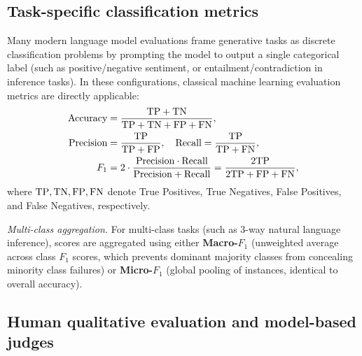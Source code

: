 \documentclass[../../../main.tex]{subfiles}
\begin{document}
\subsection{Task-specific classification metrics}
\label{subsec:classification_metrics}

Many modern language model evaluations frame generative tasks as discrete classification problems by prompting the model to output a single categorical label (such as positive/negative sentiment, or entailment/contradiction in inference tasks). In these configurations, classical machine learning evaluation metrics are directly applicable:
\begin{align}
\label{eq:accuracy_def}
\text{Accuracy} &= \frac{\mathrm{TP} + \mathrm{TN}}{\mathrm{TP} + \mathrm{TN} + \mathrm{FP} + \mathrm{FN}}, \\
\label{eq:precision_class_def}
\text{Precision} &= \frac{\mathrm{TP}}{\mathrm{TP} + \mathrm{FP}}, \quad \text{Recall} = \frac{\mathrm{TP}}{\mathrm{TP} + \mathrm{FN}}, \\
\label{eq:f1_class_def}
F_1 &= 2 \cdot \frac{\text{Precision} \cdot \text{Recall}}{\text{Precision} + \text{Recall}} = \frac{2 \mathrm{TP}}{2 \mathrm{TP} + \mathrm{FP} + \mathrm{FN}},
\end{align}
where $\mathrm{TP}, \mathrm{TN}, \mathrm{FP}, \mathrm{FN}$ denote True Positives, True Negatives, False Positives, and False Negatives, respectively.

\textit{Multi-class aggregation.} For multi-class tasks (such as 3-way natural language inference), scores are aggregated using either \textbf{Macro-$F_1$} (unweighted average across class $F_1$ scores, which prevents dominant majority classes from concealing minority class failures) or \textbf{Micro-$F_1$} (global pooling of instances, identical to overall accuracy).

\subsection{Human qualitative evaluation and model-based judges}
\label{subsec:human_eval_judges}
\end{document}
